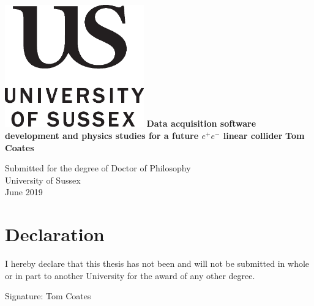 \documentclass[a4paper,11pt]{report}
\begin{document}


\thispagestyle{empty}
\begin{center}
\includegraphics[width=6cm]{../Pictures/uslogonew.eps}
\vskip40mm
\huge\textbf{Data acquisition software development and physics studies for a future $e^+e^-$ linear collider}
\vskip5mm
\Large\textbf{Tom Coates}
\normalsize
\end{center}
\vfill
\begin{flushleft}
\large
Submitted for the degree of Doctor of Philosophy \\
University of Sussex	\\
June 2019
\end{flushleft}		

\chapter*{Declaration}
I hereby declare that this thesis has not been and will not be submitted in whole or in part to another University for the award of any other degree.


\vskip5mm
Signature:
\vskip20mm
Tom Coates
\end{document}
